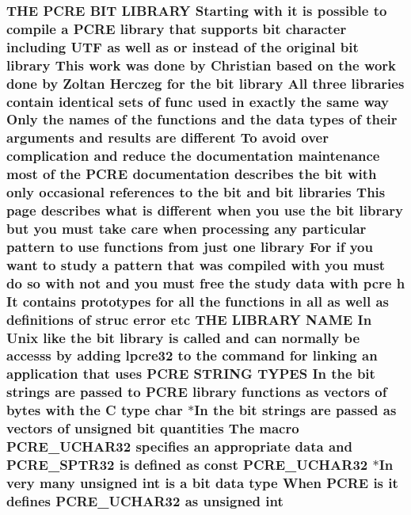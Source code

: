 \subsubsection[{\texorpdfstring{int}{int}}]{\setlength{\rightskip}{0pt plus 5cm}T\+HE {\bf P\+C\+RE} {\bf B\+IT} L\+I\+B\+R\+A\+RY Starting {\bf with} {\bf it} {\bf is} {\bf possible} {\bf to} {\bf compile} {\bf a} {\bf P\+C\+RE} {\bf library} that supports {\bf bit} {\bf character} including U\+TF {\bf as} well {\bf as} {\bf or} instead {\bf of} the original {\bf bit} {\bf library} This work was {\bf done} by Christian based {\bf on} the work {\bf done} by Zoltan Herczeg for the {\bf bit} {\bf library} All three {\bf libraries} contain {\bf identical} sets {\bf of} {\bf func} {\bf used} {\bf in} {\bf exactly} the same {\bf way} Only the {\bf names} {\bf of} the {\bf functions} and the {\bf data} {\bf types} {\bf of} their {\bf arguments} and {\bf results} {\bf are} different To avoid over {\bf complication} and reduce the {\bf documentation} {\bf maintenance} most {\bf of} the {\bf P\+C\+RE} {\bf documentation} describes the {\bf bit} {\bf with} only occasional references {\bf to} the {\bf bit} and {\bf bit} {\bf libraries} This page describes {\bf what} {\bf is} different when you use the {\bf bit} {\bf library} but you must take care when processing {\bf any} {\bf particular} {\bf pattern} {\bf to} use {\bf functions} {\bf from} just one {\bf library} For {\bf if} you want {\bf to} {\bf study} {\bf a} {\bf pattern} that was {\bf compiled} {\bf with} you must {\bf do} {\bf so} {\bf with} {\bf not} and you must {\bf free} the {\bf study} {\bf data} {\bf with} {\bf pcre} {\bf h} It {\bf contains} prototypes for {\bf all} the {\bf functions} {\bf in} {\bf all} {\bf as} well {\bf as} definitions {\bf of} struc {\bf error} etc T\+HE L\+I\+B\+R\+A\+RY N\+A\+ME In Unix like the {\bf bit} {\bf library} {\bf is} called and {\bf can} {\bf normally} {\bf be} accesss by {\bf adding} lpcre32 {\bf to} the {\bf command} for linking an application that uses {\bf P\+C\+RE} {\bf S\+T\+R\+I\+NG} T\+Y\+P\+ES In the {\bf bit} {\bf strings} {\bf are} passed {\bf to} {\bf P\+C\+RE} {\bf library} {\bf functions} {\bf as} vectors {\bf of} {\bf bytes} {\bf with} the {\bf C} {\bf type} char $\ast$In the {\bf bit} {\bf strings} {\bf are} passed {\bf as} vectors {\bf of} unsigned {\bf bit} quantities The macro {\bf P\+C\+R\+E\+\_\+\+U\+C\+H\+A\+R32} specifies an appropriate {\bf data} and {\bf P\+C\+R\+E\+\_\+\+S\+P\+T\+R32} {\bf is} {\bf defined} {\bf as} const {\bf P\+C\+R\+E\+\_\+\+U\+C\+H\+A\+R32} $\ast$In very many unsigned int {\bf is} {\bf a} {\bf bit} {\bf data} {\bf type} When {\bf P\+C\+RE} {\bf is} {\bf it} defines {\bf P\+C\+R\+E\+\_\+\+U\+C\+H\+A\+R32} {\bf as} unsigned int}\hypertarget{group__MOD__WATCHDOG_gaf0b5a943e734de7ea24142e2c81d82ef}{}\label{group__MOD__WATCHDOG_gaf0b5a943e734de7ea24142e2c81d82ef}
